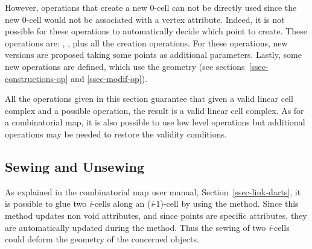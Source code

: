 However, operations that create a new 0-cell can not be directly used
since the new 0-cell would not be associated with a vertex
attribute. Indeed, it is not possible for these operations to
automatically decide which point to create. These operations are:
, 
, plus all the creation
operations. For these operations, new versions are proposed taking
some points as additional parameters.  Lastly, some new operations are
defined, which use the geometry (see sections~\ref{ssec-constructions-op} and
\ref{ssec-modif-op}).

All the operations given in this section guarantee that given a valid
linear cell complex and a possible operation, the result is a valid
linear cell complex. As for a combinatorial map, it is also possible
to use low level operations but additional operations may be needed to
restore the validity conditions.

\subsection{Sewing and Unsewing \label{ssec-lcc-link-darts}}

As explained in the combinatorial map user manual,
Section~\ref{ssec-link-darts}, it is possible to glue two \emph{i}-cells
along an (\emph{i}-1)-cell by using the  method. Since
this method updates non void attributes, and since points are specific
attributes, they are automatically updated during the 
method. Thus the sewing of two \emph{i}-cells could deform the
geometry of the concerned objects.

